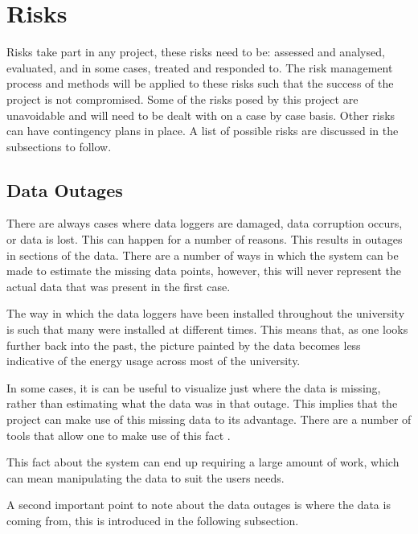 \documentclass[12pt,onecolumn]{IEEEtran}
\begin{document}
\section{Risks} \label{sec:Risks}
Risks take part in any project, these risks need to be: assessed and analysed, evaluated, and in some cases, treated and responded to.
The risk management process and methods will be applied to these risks such that the success of the project is not  compromised.
Some of the risks posed by this project are unavoidable and will need to be dealt with on a case by case basis. 
Other risks can have contingency plans in place. 
A list of possible risks are discussed in the subsections to follow.


\subsection{Data Outages} \label{sec:DataOutages}
There are always cases where data loggers are damaged, data corruption occurs, or data is lost. This can happen for a number of reasons. This results in outages in sections of the data. 
There are a number of ways in which the system can be made to estimate the missing data points, however, this will never represent the actual data that was present in the first case. 

The way in which the data loggers have been installed throughout the university is such that many were installed at different times. 
This means that, as one looks further back into the past, the picture painted by the data becomes less indicative of the energy usage across most of the university. 

In some cases, it is can be useful to visualize just where the data is missing, rather than estimating what the data was in that outage.
This implies that the project can make use of this missing data to its advantage. There are a number of tools that allow one to make use of this fact \cite{missingdata1,missingdata2}.

This fact about the system can end up requiring a large amount of work, which can mean manipulating the data to suit the users needs.

A second important point to note about the data outages is where the data is coming from, this is introduced in the following subsection.
\end{document}
